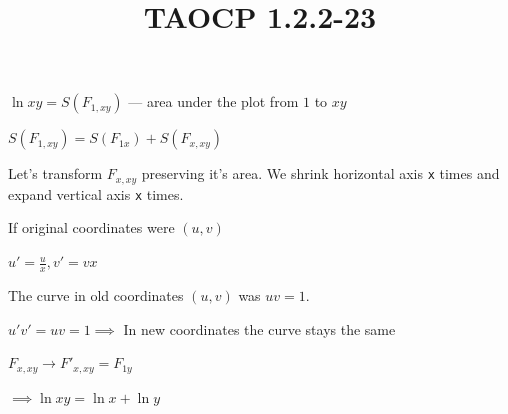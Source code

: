 \documentclass{article}
\title{TAOCP 1.2.2\mbox{-}23}
\begin{document}
\maketitle

\( \ln{xy} = S(F_{1,xy}) \) --- area under the plot from \( 1 \) to \( xy \)

\( S(F_{1,xy}) = S(F_{1x}) + S(F_{x,xy}) \)

Let's transform \( F_{x,xy} \) preserving it's area. We shrink horizontal axis \texttt{x} times and expand vertical axis \texttt{x} times.

If original coordinates were \( (u,v) \)

\( u'=\frac{u}{x}, v'=vx \)

The curve in old coordinates \( (u,v) \) was \( uv = 1 \).

\( u'v'=uv=1 \implies \) In new coordinates the curve stays the same

\( F_{x,xy} \to F'_{x,xy} = F_{1y} \)

\( \implies \ln{xy} = \ln{x} + \ln{y} \)
\end{document}
